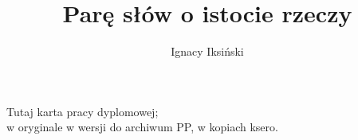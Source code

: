\documentclass[pl]{ppfcmthesis}
\author{Ignacy Iksiński}
\title{Parę słów o istocie rzeczy}
\begin{document}
\maketitle\cleardoublepage%
\thispagestyle{empty}\vspace*{\fill}\noindent\begin{center}%
Tutaj karta pracy dyplomowej;\\w oryginale w wersji do archiwum PP, w kopiach ksero.\end{center}\vfill\cleardoublepage%
\frontmatter{}\cleardoublepage%


\mainmatter%




%
{\small}

\backmatter%

\end{document}
